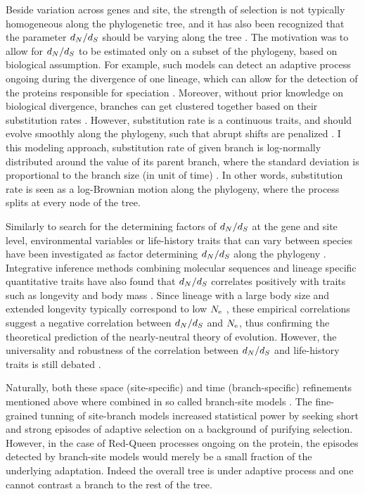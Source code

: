 Beside variation across genes and site, the strength of selection is not typically homogeneous along the phylogenetic tree, and it has also been recognized that the parameter $d_N / d_S$ should be varying along the tree \citep{Yang1998}.
The motivation was to allow for $d_N / d_S$ to be estimated only on a subset of the phylogeny, based on biological assumption.
For example, such models can detect an adaptive process ongoing during the divergence of one lineage, which can allow for the detection of the proteins responsible for speciation \citep{Yang2001, Zhang2004}.
Moreover, without \gls{prior} knowledge on biological divergence, branches can get clustered together based on their \gls{substitution} rates \citep{Dutheil2012a}.
However, \gls{substitution} rate is a continuous traits, and should evolve smoothly along the phylogeny, such that abrupt shifts are penalized \citep{Huelsenbeck2003,Seo2004}.
I this modeling approach, \gls{substitution} rate of given branch is log-normally distributed around the value of its parent branch, where the standard deviation is proportional to the branch size (in unit of time) \citep{Lartillot2011, Brevet2019}.
In other words, \gls{substitution} rate is seen as a log-Brownian motion along the phylogeny, where the process splits at every node of the tree. 

Similarly to search for the determining factors of $d_N / d_S$ at the gene and site level, environmental variables or life-history traits that can vary between species have been investigated as factor determining $d_N / d_S$ along the phylogeny \citep{Felsenstein1985,Romiguier2014}.
Integrative inference methods combining molecular sequences and lineage specific quantitative traits have also found that $d_N / d_S$ correlates positively with traits such as longevity and body mass \citep{Lartillot2011, Figuet2017}.
Since lineage with a large body size and extended longevity typically correspond to low $N_{\textrm{e}}$ \citep{Romiguier2014}, these empirical correlations suggest a negative correlation between $d_N / d_S$ and $N_{\textrm{e}}$, thus confirming the theoretical prediction of the \gls{nearly-neutral} theory of evolution.
However, the universality and robustness of the correlation between $d_N / d_S$ and life-history traits is still debated \citep{Nabholz2013, Lanfear2014, Figuet2016}.

Naturally, both these space (site-specific) and time (branch-specific) refinements mentioned above where combined in so called branch-site models \citep{Yang2002, Zhang2004, Pond2011}.
The fine-grained tunning of site-branch models increased statistical power by seeking short and strong episodes of adaptive selection on a background of purifying selection.
However, in the case of Red-Queen processes ongoing on the protein, the episodes detected by branch-site models would merely be a small fraction of the underlying adaptation.
Indeed the overall tree is under adaptive process and one cannot contrast a branch to the rest of the tree.

